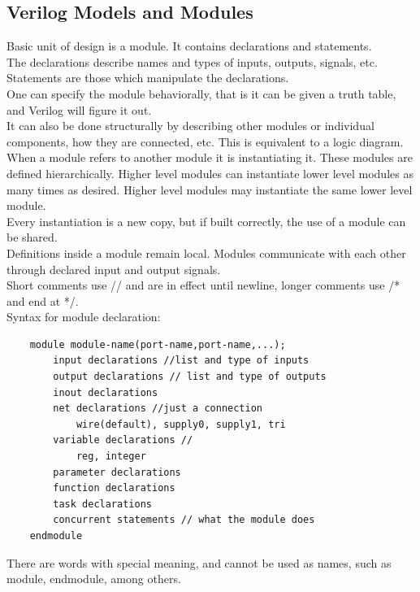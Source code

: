 \documentclass[nobib]{tufte-handout}
\begin{document}
    \subsection{Verilog Models and Modules}
    Basic unit of design is a module. It contains declarations and statements.\\
    The declarations describe names and types of inputs, outputs, signals, etc.\\
    Statements are those which manipulate the declarations.\\ One can specify the
    module behaviorally, that is it can be given a truth table, and Verilog will
    figure it out.\\ It can also be done structurally by describing other modules
    or individual components, how they are connected, etc. This is equivalent to a
    logic diagram.\\ When a module refers to another module it is instantiating it.
    These modules are defined hierarchically. Higher level modules can instantiate
    lower level modules as many times as desired. Higher level modules may
    instantiate the same lower level module.\\ Every instantiation is a new copy,
    but if built correctly, the use of a module can be shared.\\ Definitions inside
    a module remain local. Modules communicate with each other through declared
    input and output signals.\\ Short comments use // and are in effect until
    newline, longer comments use /* and end at */.\\ Syntax for module
    declaration:\\
    \begin{lstlisting}
    module module-name(port-name,port-name,...);
        input declarations //list and type of inputs
        output declarations // list and type of outputs
        inout declarations
        net declarations //just a connection
            wire(default), supply0, supply1, tri
        variable declarations //
            reg, integer
        parameter declarations
        function declarations
        task declarations
        concurrent statements // what the module does
    endmodule
\end{lstlisting}
    There are words with special meaning, and cannot be used as names, such as
    module, endmodule, among others.
\end{document}

